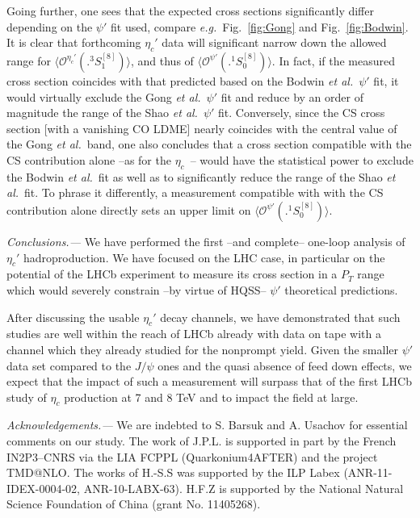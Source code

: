 \documentclass[showpacs,aps,PRL,twocolumn,footinbib,11]{revtex4-1}
\def\eg{{\it e.g.}}
\def\etal{{\it et al.}}
\def\jpsi{J/\psi}
\def\psip{\psi'}
\def\etac{\eta_c}
\def\etacp{\eta_c'}
\def\copsip{{\langle\mathcal{O}^{\psip}(\bigl.^1\! S_0^{[8]})\rangle}}
\def\coetacp{{\langle\mathcal{O}^{\etacp}(\bigl.^3\! S_1^{[8]})\rangle}}
\newcommand{\cf}[1]{{Fig.~\ref{#1}}}
\begin{document}
Going further, one sees that the expected cross sections significantly differ depending on the
$\psip$ fit used, compare  \eg\ \cf{fig:Gong} and \cf{fig:Bodwin}. 
 It is clear that forthcoming $\etacp$ data will significant narrow down the allowed range 
for $\coetacp$, and thus of $\copsip$. In fact, if the measured cross section
coincides with that predicted based on the Bodwin \etal\ $\psip$ fit, it would virtually 
exclude the Gong \etal\ $\psip$ fit and reduce by an order of magnitude the range of 
the Shao \etal\ $\psip$ fit. Conversely, since the CS cross section [with a vanishing CO LDME] 
nearly coincides with the central value of the Gong \etal\ band, one also concludes 
that a cross section compatible with the CS contribution alone --as for the $\etac$~\cite{Aaij:2014bga}-- 
would have the statistical power to exclude the Bodwin \etal\ fit as well as to significantly
reduce the range of the Shao \etal\ fit. To phrase it differently, a measurement 
compatible with with the CS contribution alone directly sets an upper limit 
on $\copsip$.


\textit{Conclusions.---}
We have performed the first --and complete-- one-loop analysis
of $\etacp$ hadroproduction. We have focused on the LHC case, in particular on 
the potential of the LHCb experiment to measure its cross section in a $P_T$ range
which would severely constrain --by virtue of HQSS-- $\psip$ theoretical predictions. 

After discussing the usable $\etacp$ decay channels, we have demonstrated
that such studies are well within the reach of LHCb already with data on tape with a
channel which they already studied for the nonprompt yield. 
Given the smaller $\psip$ data set compared to the $\jpsi$ ones and the quasi absence
of feed down effects, we expect that the impact of such a measurement will surpass that
of the first LHCb study of $\etac$ production at 7 and 8 TeV and to impact the field at large.

\textit{Acknowledgements.---}
We are indebted to S. Barsuk and A. Usachov for essential comments on our study.
The work of J.P.L. is supported in part by the French IN2P3--CNRS via the LIA FCPPL 
(Quarkonium4AFTER) and the project TMD@NLO. 
The works of H.-S.S was supported by the ILP Labex (ANR-11-IDEX-0004-02, ANR-10-LABX-63).
H.F.Z is supported by the National Natural Science Foundation of China (grant No. 11405268).




\end{document}
